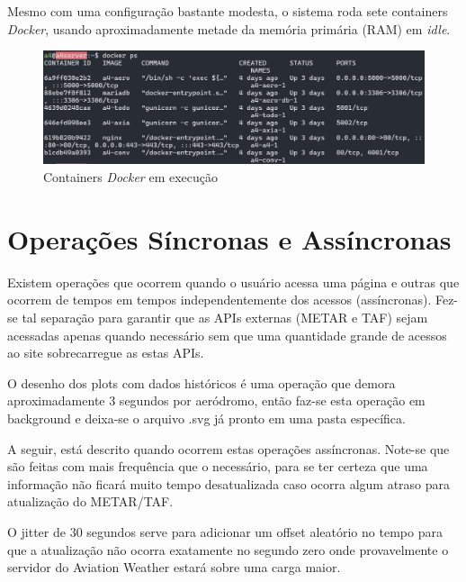 Mesmo com uma configuração bastante modesta, o sistema roda sete containers \textit{Docker}, usando 
aproximadamente metade da memória primária (RAM) em \textit{idle}.

\begin{figure}[ht]
    \begin{center}
    \includegraphics[width=400pt]{img/containers.png}
    \caption{Containers \textit{Docker} em execução}
    \label{fig:containers}
    \end{center}
\end{figure}

\section{Operações Síncronas e Assíncronas}

Existem operações que ocorrem quando o usuário acessa uma página e outras que
ocorrem de tempos em tempos independentemente dos acessos (assíncronas). Fez-se
tal separação para garantir que as APIs externas (METAR e TAF) sejam acessadas 
apenas quando
necessário sem que uma quantidade grande de acessos ao site sobrecarregue as estas APIs.

O desenho dos plots com dados históricos é uma operação que demora aproximadamente
3 segundos por aeródromo, então faz-se esta operação em background e deixa-se o 
arquivo .svg já pronto em uma pasta específica.

A seguir, está descrito quando ocorrem estas operações assíncronas. Note-se que são
feitas com mais frequência que o necessário, para se ter certeza que uma informação não
ficará muito tempo desatualizada caso ocorra algum atraso para atualização do METAR/TAF.

O jitter de 30 segundos serve para adicionar um offset aleatório no tempo para que
a atualização não ocorra exatamente no segundo zero onde provavelmente o servidor
do Aviation Weather estará sobre uma carga maior.

